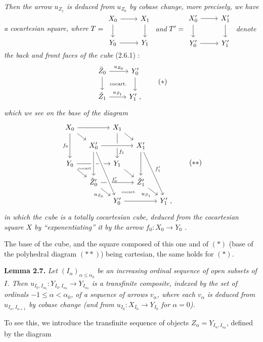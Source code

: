 \documentclass[11pt]{article}
\newcommand{\printedpage}[1]{\marginpar{\footnotesize p.~#1}}
\newcommand{\msp}[1]{\marginpar{\footnotesize [#1]}}
\begin{document}
\printedpage{18}

\msp{page 32}

\textit{Then the arrow $u_{Z_1}$ is deduced from $u_{Z_0}$ by cobase change, more precisely, we have a cocartesian square, where} $T = \begin{tikzcd}[ampersand replacement=\&, baseline=(\tikzcdmatrixname.center)]
X_0 \arrow[r] \arrow[d] \& X_1 \arrow[d] \\
Y_0 \arrow[r] \& Y_1
\end{tikzcd}$ \textit{and} $T' = \begin{tikzcd}[ampersand replacement=\&, baseline=(\tikzcdmatrixname.center)]
X'_0 \arrow[r] \arrow[d] \& X'_1 \arrow[d] \\
Y'_0 \arrow[r] \& Y'_1
\end{tikzcd}$ \textit{denote the back and front faces of the cube} \textup{(2.6.1) :}
\[
\begin{tikzcd}
\tilde{Z}_0 \arrow[r, "u_{Z_0}"] \arrow[d] \arrow[dr, phantom, "\text{\scriptsize cocart.}"] & Y'_0 \arrow[d] \\
\tilde{Z}_1 \arrow[r, "u_{Z_1}"] & Y'_1 \ ,
\end{tikzcd}
\tag*{$(*)$}
\]
\textit{which we see on the base of the diagram}
\[
\begin{tikzcd}[row sep=small, column sep=small]
X_0 \arrow[rr] \arrow[dr] \arrow[dd, "f_0"'] & & X_1 \arrow[dr] \arrow[dd, "f_1" near end] & & \\
 & X'_0 \arrow[rr, crossing over] & & X'_1 \arrow[dd] \arrow[dddr, "f'_1"] & \\
Y_0 \arrow[rr] \arrow[dr] \arrow[dr, phantom, shift left=2ex, "\text{\tiny cocart.}"] & & Y_1 \arrow[dr] & & \\
 & \tilde{Z}'_0 \arrow[rr] \arrow[dr, "u_{Z_0}"'] \arrow[from=uu, crossing over] & & \tilde{Z}'_1 \arrow[dr, "u_{Z_1}"'] & \\
 & & Y'_0 \arrow[rr] \arrow[from=uuul, crossing over, "f'_0" near end] \arrow[ur, phantom, "\text{\tiny cocart.}"] & & Y'_1 \ ,
\end{tikzcd} %
\tag*{$(**)$}
\]
\textit{in which the cube is a totally cocartesian cube, deduced from the cocartesian square $X$ by ``exponentiating'' it by the arrow $f_0 : X_0 \longrightarrow Y_0$} \textit{.}

The base of the cube, and the square
\msp{page 33}
composed of this one and of $(*)$ (base of the polyhedral diagram $(**)$) being cartesian, the same holds for $(*)$.

\textbf{Lemma 2.7.} \textit{Let $(I_\alpha)_{\alpha\leq\alpha_0}$ be an increasing ordinal sequence of open subsets of $I$. Then $u_{I_0,I_{\alpha_0}} : Y_{I_0,I_{\alpha_0}} \longrightarrow Y_{I_{\alpha_0}}$ is a transfinite composite, indexed by the set of ordinals $-1 \leq \alpha < \alpha_0$, of a sequence of arrows $v_\alpha$, where each $v_\alpha$ is deduced from $u_{I_\alpha,I_{\alpha+1}}$ by cobase change (and from $u_{I_0} : X_{I_0} \longrightarrow Y_{I_0}$ for $\alpha = 0$).}

To see this, we introduce the transfinite sequence of objects $Z_\alpha = Y_{I_\alpha,I_{\alpha_0}}$, defined by the diagram
\end{document}
